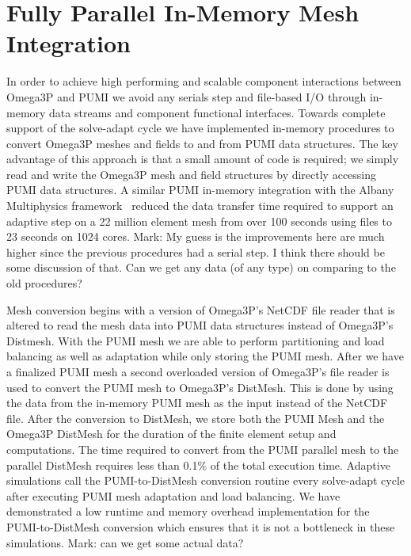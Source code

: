 \documentclass[review,12pt]{elsarticle_summary_report}
\begin{document}
\section{\label{in_memory}Fully Parallel In-Memory Mesh Integration}
In order to achieve high performing and scalable component interactions between
Omega3P and PUMI we avoid any serials step and 
file-based I/O through in-memory data streams and component functional
interfaces. Towards complete support of the solve-adapt cycle we have implemented in-memory
procedures to convert Omega3P meshes and fields to and from  PUMI data structures.
The key advantage of this approach is that a small amount of code is 
required; we simply read and write the Omega3P mesh and field
structures by directly accessing PUMI data structures.
A similar PUMI in-memory integration with the Albany Multiphysics
framework~\cite{Albany2015,salinger2013albany} reduced the data transfer time
required to support an adaptive step on a 22 million element mesh from over 100
seconds using files to 23 seconds on 1024 cores. \color{blue} Mark: My guess is the improvements here are much higher since the previous procedures had a serial step. I think there should be some discussion of that. Can we get any data (of any type) on comparing to the old procedures? \color{black}

Mesh conversion begins with a version of Omega3P's NetCDF file reader that is altered
to read the mesh data into PUMI data structures instead of Omega3P's Distmesh. With 
the PUMI mesh we are able to perform partitioning and load balancing as well as adaptation 
while only storing the PUMI mesh. After we have a finalized PUMI mesh a second 
overloaded version of Omega3P's file reader is used to convert the PUMI mesh to 
Omega3P's DistMesh. This is done by using the data from the in-memory PUMI mesh as the 
input instead of the NetCDF file. After the conversion to DistMesh, we store both the
PUMI Mesh and the Omega3P DistMesh for the duration of the finite element setup and 
computations. The time required to convert from the PUMI parallel mesh to the
parallel DistMesh requires less than 0.1\% of the total execution time.
Adaptive simulations call the PUMI-to-DistMesh conversion routine every
solve-adapt cycle after executing PUMI mesh adaptation and load balancing.
We have demonstrated a low runtime and memory overhead implementation for the
PUMI-to-DistMesh conversion which ensures that it is not a bottleneck
in these simulations. \color{blue} Mark: can we get some actual data?  \color{black}
\end{document}
